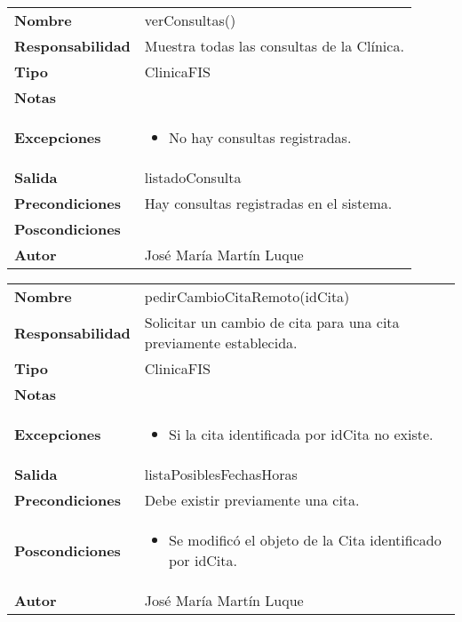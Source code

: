 \documentclass[11pt,a4paper]{article}
\newenvironment{itemizenomargins}
    {\begin{minipage}[t]{1\linewidth}\begin{itemize}}
    {\end{itemize}\end{minipage}}
\begin{document}
\begin{table}[H]
	\centering
	\label{my-label}
	\begin{tabularx}{\textwidth}{l|X}
    \textbf{Nombre}          & verConsultas()\\
		\textbf{Responsabilidad} & Muestra todas las consultas de la Clínica. \\
		\textbf{Tipo}            & ClinicaFIS \\
		\textbf{Notas}           &  \\
		\textbf{Excepciones}     &
		\begin{itemizenomargins}
			\item No hay consultas registradas.
		\end{itemizenomargins} \\
		\textbf{Salida}          &  listadoConsulta\\
		\textbf{Precondiciones}  &  Hay consultas registradas en el sistema.\\
		\textbf{Poscondiciones}  & \\  
		\textbf{Autor}			 & José María Martín Luque
	\end{tabularx}
\end{table}

\begin{table}[H]
	\centering
	\label{pedir-cambio-cita-remoto}
	\begin{tabularx}{\textwidth}{l|X}
    \textbf{Nombre}          & pedirCambioCitaRemoto(idCita)\\
		\textbf{Responsabilidad} & Solicitar un cambio de cita para una cita previamente establecida. \\
		\textbf{Tipo}            & ClinicaFIS \\
		\textbf{Notas}           &  \\
		\textbf{Excepciones}     & 
		\begin{itemizenomargins}
			\item Si la cita identificada por idCita no existe.
		\end{itemizenomargins} \\
		\textbf{Salida}          &  listaPosiblesFechasHoras\\
		\textbf{Precondiciones}  &  Debe existir previamente una cita.\\
		\textbf{Poscondiciones}  & 
		\begin{itemizenomargins}
			\item Se modificó el objeto de la Cita identificado por idCita.
		\end{itemizenomargins} \\
		\textbf{Autor}			 & José María Martín Luque
	\end{tabularx}
\end{table}
\end{document}

